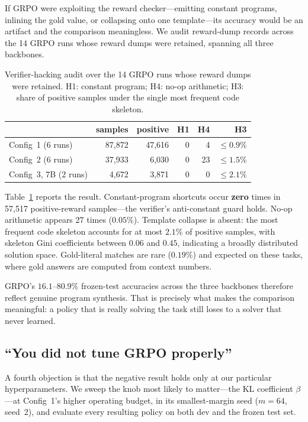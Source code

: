 If GRPO were exploiting the reward checker---emitting constant programs,
inlining the gold value, or collapsing onto one template---its accuracy would
be an artifact and the comparison meaningless. We audit reward-dump records across the 14 GRPO runs whose reward dumps were retained, spanning all three backbones.

\begin{table}[t]
\centering
\small
\setlength{\tabcolsep}{4pt}
\caption{Verifier-hacking audit over the 14 GRPO runs whose reward dumps were
retained. H1: constant program; H4: no-op arithmetic; H3: share of positive
samples under the single most frequent code skeleton.}
\label{tab:hacking}
\begin{tabular}{lrrrrr}
\toprule
& samples & positive & H1 & H4 & H3 \\
\midrule
Config~1 (6 runs)      & 87{,}872 & 47{,}616 & 0 & 4  & $\leq 0.9\%$ \\
Config~2 (6 runs)      & 37{,}933 & 6{,}030  & 0 & 23 & $\leq 1.5\%$ \\
Config~3, 7B (2 runs)  & 4{,}672  & 3{,}871  & 0 & 0  & $\leq 2.1\%$ \\
\bottomrule
\end{tabular}
\end{table}

Table~\ref{tab:hacking} reports the result. Constant-program shortcuts occur
\textbf{zero} times in 57{,}517 positive-reward samples---the verifier's
anti-constant guard holds. No-op arithmetic appears 27 times ($0.05\%$).
Template collapse is absent: the most frequent code skeleton accounts for at
most $2.1\%$ of positive samples, with skeleton Gini coefficients between
$0.06$ and $0.45$, indicating a broadly distributed solution space.
Gold-literal matches are rare ($0.19\%$) and expected on these tasks, where
gold answers are computed from context numbers.

GRPO's $16.1$--$80.9\%$ frozen-test accuracies across the three backbones
therefore reflect genuine program synthesis. That is precisely what makes the comparison meaningful: a
policy that is really solving the task still loses to a solver that never
learned.

\subsection{``You did not tune GRPO properly''}

A fourth objection is that the negative result holds only at our particular
hyperparameters. We sweep the knob most likely to matter---the KL coefficient
$\beta$---at Config~1's higher operating budget, in its smallest-margin seed
($m{=}64$, seed~2), and evaluate every resulting policy on both dev and the
frozen test set.

